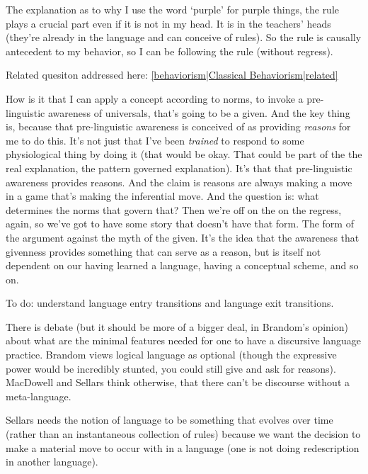 The explanation as to why I use the word `purple' for purple things, the rule plays a crucial part even if it is not in my head. It is in the teachers' heads (they're already in the language and can conceive of rules). So the rule is causally antecedent to my behavior, so I can be following the rule (without regress).

Related quesiton addressed here: \ref{behaviorism|Classical Behaviorism|related}

How is it that I can apply a concept according to norms, to invoke a pre-linguistic awareness of universals, that's going to be a given. And the key thing is, because that pre-linguistic awareness is conceived of as providing \emph{reasons} for me to do this. It's not just that I've been \emph{trained} to respond to some physiological thing by doing it (that would be okay. That could be part of the the real explanation, the pattern governed explanation). It's that that pre-linguistic awareness provides reasons. And the claim is reasons are always making a move in a game that's making the inferential move. And the question is: what determines the norms that govern that? Then we're off on the on the regress, again, so we've got to have some story that doesn't have that form. The form of the argument against the myth of the given. It's the idea that the awareness that givenness provides something that can serve as a reason, but is itself not dependent on our having learned a language, having a conceptual scheme, and so on.

To do: understand language entry transitions and language exit transitions.

There is debate (but it should be more of a bigger deal, in Brandom's opinion) about what are the minimal features needed for one to have a discursive language practice. Brandom views logical language as optional (though the expressive power would be incredibly stunted, you could still give and ask for reasons). MacDowell and Sellars think otherwise, that there can't be discourse without a meta-language.

Sellars needs the notion of language to be something that evolves over time (rather than an instantaneous collection of rules) because we want the decision to make a material move to occur with in a language (one is not doing redescription in another language).